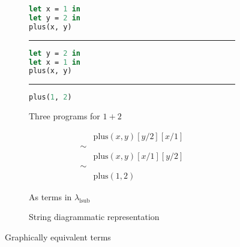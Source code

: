 \begin{figure}
	\centering
	\begin{subfigure}{0.3\linewidth}
		\begin{lstlisting}[language=ML]
let x = 1 in
let y = 2 in
plus(x, y)
                \end{lstlisting}
		\hrule
		\begin{lstlisting}[language=ML]
let y = 2 in
let x = 1 in
plus(x, y)
                \end{lstlisting}
		\hrule
		\begin{lstlisting}[language=ML]
plus(1, 2)
                \end{lstlisting}
		\caption{Three programs for $1 + 2$}%
		\label{fig:plus-1-2-programs}
	\end{subfigure}
	\hspace{2em}
	\begin{subfigure}{0.2\linewidth}
		\begin{align*}
			     & \text{plus}(x, y)[y/2][x/1] \\
			\sim &                             \\
			     & \text{plus}(x, y)[x/1][y/2] \\
			\sim &                             \\
			     & \text{plus}(1, 2)
		\end{align*}
		\caption{As terms in $\lambda_{\text{lsub}}$}%
		\label{fig:plus-1-2-terms}
	\end{subfigure}
	\hspace{2em}
	\begin{subfigure}{0.2\linewidth}
		\centering
		\caption{String diagrammatic representation}%
		\label{fig:plus-1-2-string-diagram}
	\end{subfigure}
	\caption{Graphically equivalent terms}%
	\label{fig:plus-1-2}
\end{figure}

